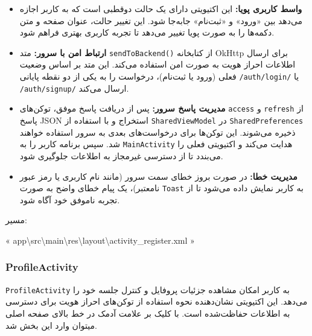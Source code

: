 \documentclass{report}
\begin{document}
\begin{itemize}
	\item \textbf{واسط کاربری پویا:} این اکتیویتی دارای یک حالت دو‌قطبی است که به کاربر اجازه می‌دهد بین «ورود» و «ثبت‌نام» جابه‌جا شود. این تغییر حالت، عنوان صفحه و متن دکمه‌ها را به صورت پویا تغییر می‌دهد تا تجربه کاربری بهتری فراهم شود.
	
	\item \textbf{ارتباط امن با سرور:} متد \texttt{sendToBackend()} از کتابخانه OkHttp برای ارسال اطلاعات احراز هویت به صورت امن استفاده می‌کند. این متد بر اساس وضعیت فعلی (ورود یا ثبت‌نام)، درخواست را به یکی از دو نقطه پایانی \texttt{/auth/login/} یا \texttt{/auth/signup/} ارسال می‌کند.
	
	\item \textbf{مدیریت پاسخ سرور:} پس از دریافت پاسخ موفق، توکن‌های \texttt{access} و \texttt{refresh} از پاسخ JSON استخراج و با استفاده از \texttt{SharedViewModel} در \texttt{SharedPreferences} ذخیره می‌شوند. این توکن‌ها برای درخواست‌های بعدی به سرور استفاده خواهند شد. سپس برنامه کاربر را به \texttt{MainActivity} هدایت می‌کند و اکتیویتی فعلی را می‌بندد تا از دسترسی غیرمجاز به اطلاعات جلوگیری شود.
	
	\item \textbf{مدیریت خطا:} در صورت بروز خطای سمت سرور (مانند نام کاربری یا رمز عبور نامعتبر)، یک پیام خطای واضح به صورت \texttt{Toast} به کاربر نمایش داده می‌شود تا از تجربه ناموفق خود آگاه شود.
\end{itemize}
\begin{note}{مسیر:}
	\begin{latin}
		« app\textbackslash src\textbackslash main\textbackslash res\textbackslash layout\textbackslash activity\_register.xml »
	\end{latin}
\end{note}
\subsubsection{ProfileActivity}
\texttt{ProfileActivity} به کاربر امکان مشاهده جزئیات پروفایل و کنترل جلسه خود را می‌دهد. این اکتیویتی نشان‌دهنده نحوه استفاده از توکن‌های احراز هویت برای دسترسی به اطلاعات حفاظت‌شده است. با کلیک بر علامت آدمک در خط بالای صفحه اصلی میتوان وارد این بخش شد.
\end{document}
